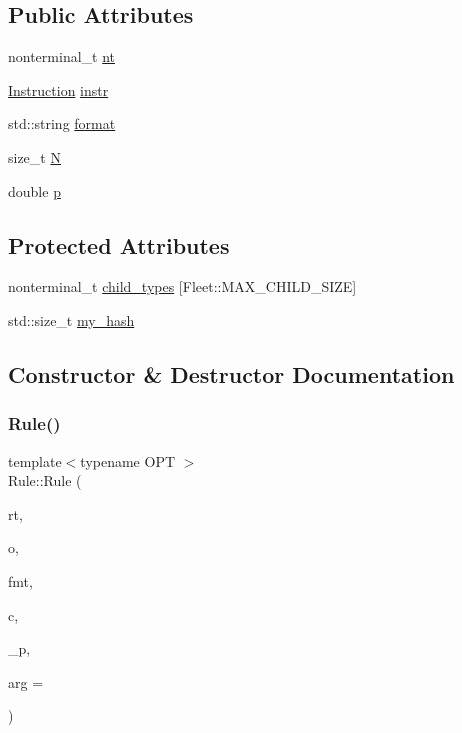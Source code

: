 \subsection*{Public Attributes}
\begin{DoxyCompactItemize}
\item 
nonterminal\+\_\+t \hyperlink{class_rule_a980385e76137909454bd6a585bd2e138}{nt}
\item 
\hyperlink{class_instruction}{Instruction} \hyperlink{class_rule_a367e578f5e1427ef04d1d77477565c67}{instr}
\item 
std\+::string \hyperlink{class_rule_aa48c15aaaf5242afea0439607f2a2177}{format}
\item 
size\+\_\+t \hyperlink{class_rule_a0a2a742af39b60831ad1ac5eb5ba7498}{N}
\item 
double \hyperlink{class_rule_acd7e4d41d59dec76f60ca16238ab391a}{p}
\end{DoxyCompactItemize}
\subsection*{Protected Attributes}
\begin{DoxyCompactItemize}
\item 
nonterminal\+\_\+t \hyperlink{class_rule_a2d5160625d3d15f60690c4323522a33e}{child\+\_\+types} \mbox{[}Fleet\+::\+M\+A\+X\+\_\+\+C\+H\+I\+L\+D\+\_\+\+S\+I\+ZE\mbox{]}
\item 
std\+::size\+\_\+t \hyperlink{class_rule_af2d873c97e2de425f14a5a980dbcc104}{my\+\_\+hash}
\end{DoxyCompactItemize}


\subsection{Constructor \& Destructor Documentation}
\mbox{\label{class_rule_a1e65fa1bce404b1513038a9dd4ffcb9f}} 
\subsubsection{\texorpdfstring{Rule()}{Rule()}}
{\footnotesize\ttfamily template$<$typename O\+PT $>$ \\
Rule\+::\+Rule (\begin{DoxyParamCaption}\item[{const nonterminal\+\_\+t}]{rt,  }\item[{const O\+PT}]{o,  }\item[{const std\+::string}]{fmt,  }\item[{std\+::initializer\+\_\+list$<$ nonterminal\+\_\+t $>$}]{c,  }\item[{double}]{\+\_\+p,  }\item[{const int}]{arg = {} }\end{DoxyParamCaption})\hspace{0.3cm}{\ttfamily [inline]}}




